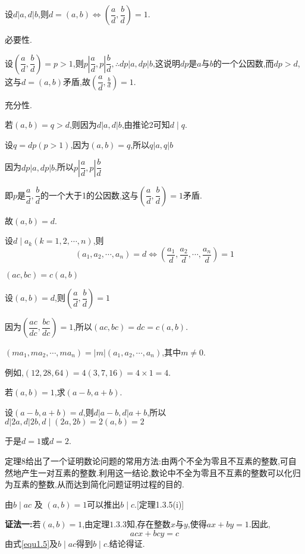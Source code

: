 \theorem 设$d|a, d| b$,则$d=(a, b) \Leftrightarrow\left(\dfrac{a}{d}, \dfrac{b}{d}\right)=1$.

\proof 必要性.

设$\left(\dfrac{a}{d}, \dfrac{b}{d}\right)=p>1$,则$p\left|\dfrac{a}{d}, p\right| \dfrac{b}{d}, \therefore d p|a, d p| b$,这说明$d p$是$a$与$b$的一个公因数,而$d p>d$,这与$d=(a, b)$矛盾,故$\left(\dfrac{a}{d}, \frac{b}{d}\right)=1$.

充分性.

若$(a, b)=q>d$,则因为$d|a, d| b$,由推论2可知$d \mid q$.

设$q=d p(p>1)$,因为$(a, b)=q$,所以$q|a, q| b$

因为$d p|a, d p| b$,所以$p\left|\dfrac{a}{d}, p\right| \dfrac{b}{d}$

即$p$是$\dfrac{a}{d}, \dfrac{b}{d}$的一个大于1的公因数,这与$\left(\dfrac{a}{d}, \dfrac{b}{d}\right)=1$矛盾.

故$(a, b)=d$.

\corollary 设$d \mid a_{k}(k=1,2, \cdots, n)$,则
\begin{equation*}
	\left(a_{1}, a_{2}, \cdots, a_{n}\right)=d \Leftrightarrow\left(\frac{a_{1}}{d}, \frac{a_{2}}{d}, \cdots, \frac{a_{n}}{d}\right)=1
\end{equation*}

\theorem $(a c, b c)=c(a, b)$

\proof 设$(a, b)=d$,则$\left(\dfrac{a}{d}, \dfrac{b}{d}\right)=1$

因为$\left(\dfrac{a c}{d c}, \dfrac{b c}{d c}\right)=1$,所以$(a c, b c)=d c=c(a, b)$.

\corollary $\left(m a_{1}, m a_{2}, \cdots, m a_{n}\right)=|m|\left(a_{1}, a_{2}, \cdots, a_{n}\right)$,其中$m \neq 0$.

例如,$(12,28,64)=4(3,7,16)=4 \times 1=4$.

\example 若$(a, b)=1$,求$(a-b, a+b)$.

\solve 设$(a-b, a+b)=d$,则$d|a-b, d| a+b$,所以$d|2 a, d| 2 b, d \mid(2 a, 2 b)=2(a, b)=2$

于是$d=1$或$d=2$.

\remark 定理8给出了一个证明数论问题的常用方法:由两个不全为零且不互素的整数,可自然地产生一对互素的整数.利用这一结论,数论中不全为零且不互素的整数可以化归为互素的整数,从而达到简化问题证明过程的目的.

\theorem 由$b \mid a c$ 及 $(a, b)=1$可以推出$b \mid c$.{\color{red}[定理1.3.5(i)]}

\proof \textbf{证法一:}若$(a, b)=1$,由定理$1.3.3$知,存在整数$x$与$y$,使得$a x+b y=1$.因此,
\begin{equation}\label{equ1.5}
	a c x+b c y=c
\end{equation}
由式\eqref{equ1.5}及$b \mid a c$得到$b \mid c$.结论得证.

